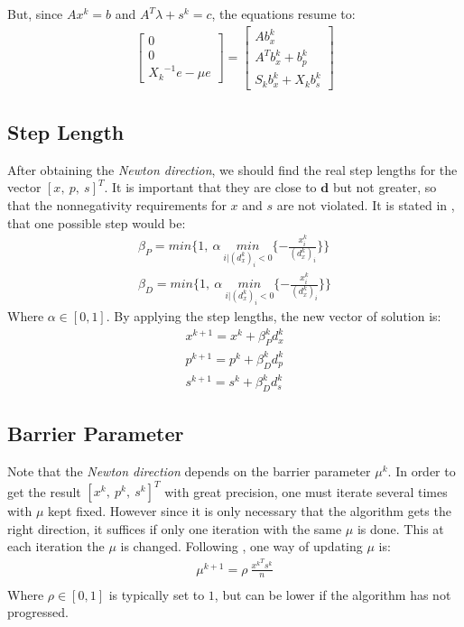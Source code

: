 \documentclass[a4paper]{IEEEtran}
\begin{document}
But, since $Ax^k = b$ and $A^{T}\lambda + s^k = c$, the equations resume to:
 \begin{align}
	 \begin{bmatrix}
			0\\
			0\\
			{X_k}^{-1} e - \mu e
		\end{bmatrix} =
		 \begin{bmatrix}
			A b_x^k\\
			A^T b_x^k + b_p^k\\
			S_k b_x^k + X_k b_s^k
		\end{bmatrix}
\end{align}  

\subsection{Step Length}
After obtaining the \emph{Newton direction}, we should find the real step lengths for the vector $[x, ~ p, ~ s]^T$. It is important that they are close to $\textbf{d}$ but not greater, so that the nonnegativity requirements for $x$ and $s$ are not violated. It is stated in \cite{bertsimas}, that one possible step would be:
 \begin{align}
	 \beta_P = min \{1, ~\alpha~ \underset{i|(d^k_x)_i < 0}{min} \{ - \frac{x^k_i}{(d^k_x)_i}\} \} \\
	 \beta_D = min \{1, ~\alpha~ \underset{i|(d^k_x)_i < 0}{min} \{ - \frac{x^k_i}{(d^k_x)_i}\} \}		 
\end{align}  
Where $\alpha \in [0,1]$. By applying the step lengths, the new vector of solution is:
 \begin{align}
	 x^{k+1} = x^k + \beta_P^k d_x^k \\
	 p^{k+1} = p^k + \beta_D^k d_p^k \\ 		 
	 s^{k+1} = s^k + \beta_D^k d_s^k
\end{align}  

\subsection{Barrier Parameter}
Note that the \emph{Newton direction} depends on the barrier parameter $\mu^k$. In order to get the result $[x^k, ~ p^k, ~ s^k]^T$ with great precision, one must iterate several times with $\mu$ kept fixed. However since it is only necessary that the algorithm gets the right direction, it suffices if only one iteration with the same $\mu$ is done. This at each iteration the $\mu$ is changed. Following \cite{bertsimas}, one way of updating $\mu$ is:
 \begin{align*}
	 \mu^{k+1} = \rho ~ \frac{{x^k}^T{s^k}}{n} \\
\end{align*}
Where $\rho \in [0,1]$ is typically set to $1$, but can be lower if the algorithm has not progressed.
\end{document}
